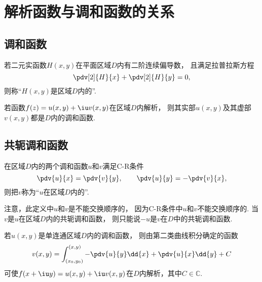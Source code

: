\section{解析函数与调和函数的关系}
\subsection{调和函数}
\begin{definition}
若二元实函数\(H(x,y)\)在平面区域\(D\)内有二阶连续偏导数，
且满足拉普拉斯方程\begin{equation*}
	\pdv[2]{H}{x} + \pdv[2]{H}{y} = 0,
\end{equation*}
则称“\(H(x,y)\)是区域\(D\)内的”.
\end{definition}

\begin{theorem}
若函数\(f(z)=u(x,y)+\iu v(x,y)\)在区域\(D\)内解析，
则其实部\(u(x,y)\)及其虚部\(v(x,y)\)都是\(D\)内的调和函数.
\end{theorem}

\subsection{共轭调和函数}
\begin{definition}
在区域\(D\)内的两个调和函数\(u\)和\(v\)满足C-R条件\begin{equation*}
	\pdv{u}{x}=\pdv{v}{y}, \qquad
	\pdv{u}{y}=-\pdv{v}{x},
\end{equation*}
则把\(v\)称为“\(u\)在区域\(D\)内的”.
\end{definition}
注意，此定义中\(u\)和\(v\)是不能交换顺序的，
因为C-R条件中\(u\)和\(v\)不能交换顺序的.
当\(v\)是\(u\)在区域\(D\)内的共轭调和函数，
则只能说\(-u\)是\(v\)在\(D\)中的共轭调和函数.

\begin{theorem}
若\(u(x,y)\)是单连通区域\(D\)内的调和函数，
则由第二类曲线积分确定的函数\begin{equation*}
	v(x,y)
	= \int_{(x_0,y_0)}^{(x,y)}
		-\pdv{u}{y} \dd{x} + \pdv{u}{x} \dd{y} + C
\end{equation*}
可使\(f(x+\iu y)=u(x,y)+\iu v(x,y)\)在\(D\)内解析，其中\(C\in\mathbb{C}\).
\end{theorem}
